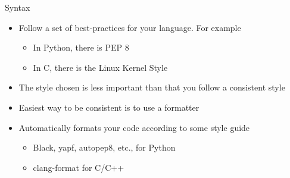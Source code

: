 \begin{frame}{Syntax}
    \begin{itemize}[<+->]
        \item Follow a set of best-practices for your language. For example
              \begin{itemize}[<+->]
                  \item In Python, there is PEP 8
                  \item In C, there is the Linux Kernel Style
              \end{itemize}
        \item The style chosen is less important than that you follow a consistent style
    \end{itemize}
    \pause
    \begin{multicols}{2}
        \pause
    \end{multicols}
    \pause
    \begin{itemize}[<+->]
        \item Easiest way to be consistent is to use a formatter
        \item Automatically formats your code according to some style guide
              \begin{itemize}[<+->]
                  \item Black, yapf, autopep8, etc., for Python
                  \item clang-format for C/C++
              \end{itemize}
    \end{itemize}
\end{frame}

